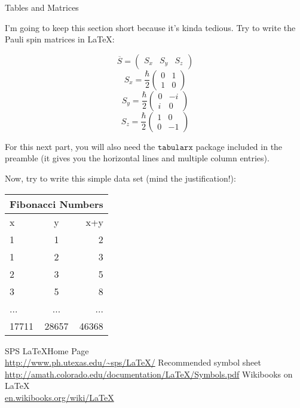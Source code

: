 \documentclass{article}
\begin{document}
\begin{section}{Tables and Matrices}

I'm going to keep this section short because it's kinda tedious. Try to write the Pauli spin matrices in \LaTeX:

\Large
\begin{equation}
	\overline{S}=\left(\begin{array}{ccc}
		S_x & S_y & S_z \end{array} \right)
\end{equation}
\begin{equation}
		S_x=\frac{\hbar}{2} \left( \begin{array}{cc}
		0 & 1 \\
		1 & 0 \end{array}\right)
\end{equation}
\begin{equation}
	S_y=\frac{\hbar}{2} \left( \begin{array}{cc}
		0 & -i \\
		i & 0 \end{array} \right)
\end{equation}
\begin{equation}
	S_z=\frac{\hbar}{2}\left(\begin{array}{cc}
		1 & 0 \\
		0 & -1 \end{array}\right)
\end{equation}

\normalsize
For this next part, you will also need the $\texttt{tabularx}$ package included in the preamble (it gives you the horizontal lines and multiple column entries).

Now, try to write this simple data set (mind the justification!):

\Huge

\begin{tabular}{ l | c || r}
\multicolumn{3}{c}{Fibonacci Numbers}\\
\hline 
x & y & x+y \\ 
\hline
1 & 1 & 2 \\
1 & 2 & 3 \\
2 & 3 & 5 \\
3 & 5 & 8 \\
... & ... & ... \\
\hline
17711 & 28657 & 46368 
\end{tabular}
\end{section}
\normalsize

\begin{thebibliography}{9}
	SPS \LaTeX Home Page \\
	\url{http://www.ph.utexas.edu/~sps/LaTeX/}
	Recommended symbol sheet \\
	\url{http://amath.colorado.edu/documentation/LaTeX/Symbols.pdf}
	Wikibooks on \LaTeX \\
	\url{en.wikibooks.org/wiki/LaTeX}
\end{thebibliography}
\end{document}
